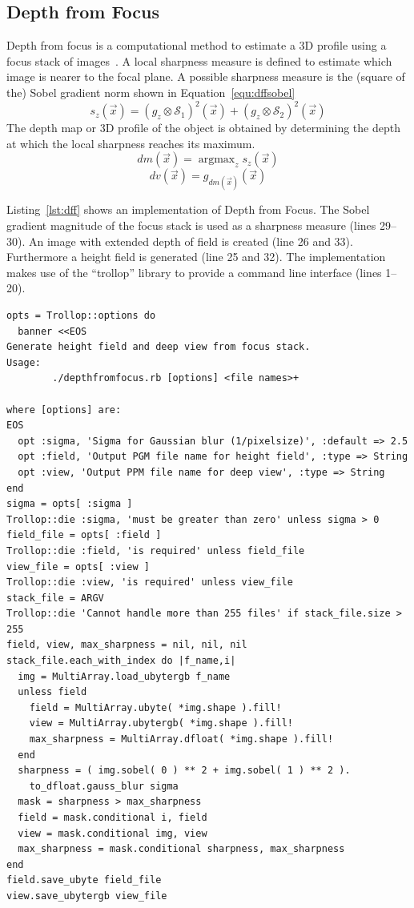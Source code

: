 \documentclass[12pt,a4paper,oneside,openright]{book}
\newcommand{\equ}[1]{Equation~\ref{equ:#1}}
\newcommand{\lst}[1]{Listing~\ref{lst:#1}}
\begin{document}
\begin{CJK}{UTF8}{}
\subsection{Depth from Focus}
Depth from focus is a computational method to estimate a \ac{3D} profile using a focus stack of images~\citep{RefWorks:437}. A local sharpness measure is defined to estimate which image is nearer to the focal plane. A possible sharpness measure is the (square of the) Sobel gradient norm shown in \equ{dffsobel}
\begin{equation}\label{equ:dffsobel}
  s_{z}(\vec{x})=(g_z\otimes\mathcal{S}_1)^2(\vec{x})+(g_z\otimes\mathcal{S}_2)^2(\vec{x})
\end{equation}
The depth map or \ac{3D} profile of the object is obtained by determining the depth at which the local sharpness reaches its maximum.
\begin{equation}\label{equ:dm}
  dm(\vec{x})=\mathop{\operatorname{argmax}}_{z}s_{z}(\vec{x})
\end{equation}
\begin{equation}\label{equ:dv}
  dv(\vec{x})=g_{dm(\vec{x})}(\vec{x})
\end{equation}

\lst{dff} shows an implementation of Depth from Focus. The Sobel gradient magnitude of the focus stack is used as a sharpness measure (lines 29--30). An image with extended depth of field is created (line 26 and 33). Furthermore a height field is generated (line 25 and 32). The implementation makes use of the ``trollop'' library to provide a command line interface (lines 1--20).
\lstset{language=Ruby,frame=single,numbers=left}
\begin{lstlisting}[float,caption={Implementation of Depth from Focus},escapechar=\$,label=lst:dff]
opts = Trollop::options do
  banner <<EOS
Generate height field and deep view from focus stack.
Usage:
        ./depthfromfocus.rb [options] <file names>+

where [options] are:
EOS
  opt :sigma, 'Sigma for Gaussian blur (1/pixelsize)', :default => 2.5
  opt :field, 'Output PGM file name for height field', :type => String
  opt :view, 'Output PPM file name for deep view', :type => String
end
sigma = opts[ :sigma ]
Trollop::die :sigma, 'must be greater than zero' unless sigma > 0
field_file = opts[ :field ]
Trollop::die :field, 'is required' unless field_file
view_file = opts[ :view ]
Trollop::die :view, 'is required' unless view_file
stack_file = ARGV
Trollop::die 'Cannot handle more than 255 files' if stack_file.size > 255
field, view, max_sharpness = nil, nil, nil
stack_file.each_with_index do |f_name,i|
  img = MultiArray.load_ubytergb f_name
  unless field
    field = MultiArray.ubyte( *img.shape ).fill!
    view = MultiArray.ubytergb( *img.shape ).fill!
    max_sharpness = MultiArray.dfloat( *img.shape ).fill!
  end
  sharpness = ( img.sobel( 0 ) ** 2 + img.sobel( 1 ) ** 2 ).
    to_dfloat.gauss_blur sigma
  mask = sharpness > max_sharpness
  field = mask.conditional i, field
  view = mask.conditional img, view
  max_sharpness = mask.conditional sharpness, max_sharpness
end
field.save_ubyte field_file
view.save_ubytergb view_file
\end{lstlisting}


\end{CJK}
\end{document}

